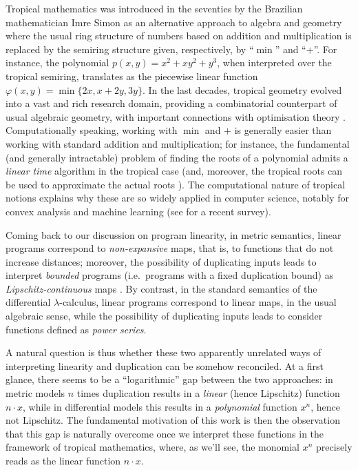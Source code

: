 Tropical mathematics was introduced in the seventies by the Brazilian mathematician Imre Simon \cite{Simon} as an alternative approach to algebra and geometry where the usual ring structure of numbers based on addition and multiplication is replaced by the semiring structure given, respectively, by ``$\min$'' and ``$+$''.
%
%
For instance, the polynomial $p(x,y)=x^{2}+xy^{2}+y^{3}$, when interpreted over the tropical semiring, translates as the piecewise linear function
$
\varphi(x,y)=\min\{2x, x+2y, 3y\}
$.
In the last decades, tropical geometry evolved into a vast and rich research domain, providing a combinatorial counterpart of usual algebraic geometry, with important connections with optimisation theory \cite{Sturmfelds}.
Computationally speaking, working with $\min$ and $+$ is generally easier than working with standard addition and multiplication; for instance, the fundamental (and generally intractable) problem of finding the roots of a polynomial admits a \emph{linear time} algorithm in the tropical case (and, moreover,  the tropical roots can be used to approximate the actual roots \cite{Noferini2015}).
The computational nature of tropical notions explains why these are so widely applied in computer science, notably for convex analysis and machine learning (see \cite{Maragos2021} for a recent survey).

Coming back to our discussion on program linearity, in metric semantics, linear programs correspond to \emph{non-expansive} maps, that is, to functions that do not increase distances; moreover, the possibility of duplicating inputs leads to interpret \emph{bounded} programs (i.e.~programs with a fixed duplication bound) as \emph{Lipschitz-continuous} maps \cite{Gaboardi2017}.
By contrast, in the standard semantics of the differential $\lambda$-calculus, linear programs correspond to linear maps, in the usual algebraic sense, while the possibility of duplicating inputs leads to consider functions defined as \emph{power series}.

A natural question is thus whether these two apparently unrelated ways of interpreting linearity and duplication can be somehow reconciled. At a first glance, there seems to be a  ``logarithmic'' gap between the two approaches:
in metric models $n$ times duplication results in a \emph{linear} (hence Lipschitz) function $n\cdot x$, while in differential models this results in a \emph{polynomial} function $x^{n}$, hence not Lipschitz. The fundamental motivation of this work is then the observation that 
this gap is naturally overcome once we interpret these functions in the framework of tropical mathematics, where, as we'll see, the monomial $x^{n}$ precisely reads as the linear function $n\cdot x$.

